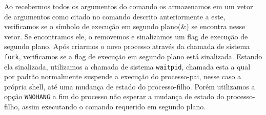 \documentclass[12pt]{article}
\begin{document}
Ao recebermos todos os argumentos do comando os armazenamos em um vetor de argumentos como citado no comando descrito anteriormente a este, verificamos se o símbolo de execução em segundo plano(\&) se encontra nesse vetor.
Se encontramos ele, o removemos e sinalizamos um flag de execução de segundo plano.
Após criarmos o novo processo através da chamada de sistema \texttt{fork},
verificamos se a flag de execução em segundo plano está sinalizada.
Estando ela sinalizada, utilizamos a chamada de sistema \texttt{waitpid},
chamada esta a qual por padrão normalmente suspende a execução do processo-pai,
nesse caso a própria shell, até uma mudança de estado do processo-filho.
Porém utilizamos a opção \texttt{WNOHANG} a fim do processo não esperar
a mudança de estado do processo-filho, assim executando o comando requerido em segundo plano.


%

\end{document}
